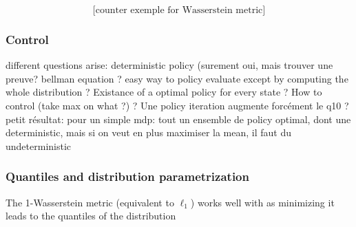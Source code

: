 \[ \text{[counter exemple for Wasserstein metric]} \]

\subsubsection*{Control}

different questions arise: deterministic policy (surement oui, mais trouver une preuve? bellman equation ? easy way to policy evaluate except by computing the whole distribution ? Existance of a optimal policy for every state ? How to control (take max on what ?) ? Une policy iteration augmente forcément le q10 ?
petit résultat: pour un simple mdp: tout un ensemble de policy optimal, dont une deterministic, mais si on veut en plus maximiser la mean, il faut du undeterministic

\subsubsection*{Quantiles and distribution parametrization}

The 1-Wasserstein metric (equivalent to $\ell_1$) works well with as minimizing it leads to the quantiles of the distribution
